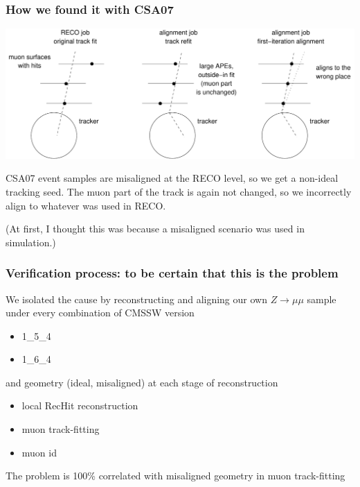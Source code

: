 \documentclass[compress]{beamer}
\begin{document}
\begin{frame}
\frametitle{How we found it with CSA07}

\includegraphics[width=\linewidth]{mistake2.pdf}

\vfill CSA07 event samples are misaligned at the RECO level, so we get
a non-ideal tracking seed.  The muon part of the track is again not
changed, so we incorrectly align to whatever was used in RECO.

\vfill (At first, I thought this was because a misaligned scenario was
used in simulation.)

\end{frame}

\begin{frame}
\frametitle{Verification process: to be certain that this is the problem}

We isolated the cause by reconstructing and aligning our own
$Z\to\mu\mu$ sample under every combination of CMSSW version
\begin{itemize}
\item 1\_5\_4
\item 1\_6\_4
\end{itemize}
and geometry (ideal, misaligned)
at each stage of reconstruction
\begin{itemize}
\item local RecHit reconstruction
\item muon track-fitting
\item muon id
\end{itemize}

\vfill The problem is 100\% correlated with misaligned geometry in muon
track-fitting

\end{frame}
\end{document}
